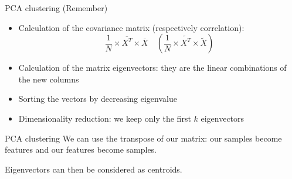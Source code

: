 \begin{frame}{PCA clustering}
  (Remember)

  \begin{itemize}
    \item Calculation of the covariance matrix (respectively correlation):
      \[
      \frac{1}{N} \times \overline{X^T} \times \overline{X}
      \quad
      ( \frac{1}{N} \times \widetilde{X^T} \times \widetilde{X} )
      \]
    \item Calculation of the matrix eigenvectors: they are the linear combinations of the new columns
    \item Sorting the vectors by decreasing eigenvalue
    \item Dimensionality reduction: we keep only the first $k$ eigenvectors
  \end{itemize}
\end{frame}

\begin{frame}{PCA clustering}
  We can use the transpose of our matrix: our samples become features and our features become samples.

  Eigenvectors can then be considered as centroids.
\end{frame}
